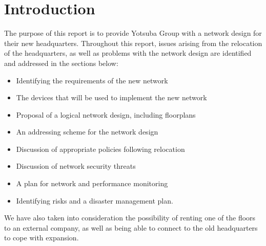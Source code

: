\chapter{Introduction}
The purpose of this report is to provide Yotsuba Group with a network design for their new headquarters. Throughout this report, issues arising from the relocation of the headquarters, as well as problems with the network design are identified and addressed in the sections below:
\begin{itemize}
    \item Identifying the requirements of the new network
    \item The devices that will be used to implement the new network
    \item Proposal of a logical network design, including floorplans
    \item An addressing scheme for the network design
    \item Discussion of appropriate policies following relocation
    \item Discussion of network security threats
    \item A plan for network and performance monitoring
    \item Identifying risks and a disaster management plan.
\end{itemize}
We have also taken into consideration the possibility of renting one of the floors to an external company, as well as being able to connect to the old headquarters to cope with expansion.